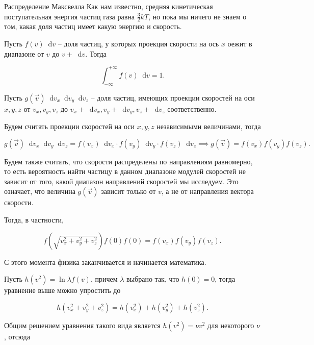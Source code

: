 \documentclass{article}
\renewcommand{\d}{\mathop{}\!\mathrm{d}}
\begin{document}
	\begin{section}{Распределение Максвелла}
		Как нам известно, средняя кинетическая поступательная энергия частиц газа равна $\frac{3}{2} kT$, но пока мы ничего не знаем о том, какая доля частиц имеет какую энергию и скорость.

		Пусть $f(v) \d v$ -- доля частиц, у которых проекция скорости на ось $x$ оежит в диапазоне от $v$ до $v + \d v$. Тогда

		\begin{equation*}
			\int_{-\infty}^{+\infty} f(v) \d v = 1.
		\end{equation*}

		Пусть $g(\vec{v}) \d v_x \d v_y \d v_z$ -- доля частиц, имеющих проекции скоростей на оси $x, y, z$ от $v_x, v_y, v_z$ до $v_x + \d v_x, v_y + \d v_y, v_z + \d v_z$ соответственно.

		Будем считать проекции скоростей на оси $x, y, z$ независимыми величинами, тогда

		\begin{equation*}
			g(\vec{v}) \d v_x \d v_y \d v_z = f(v_x) \d v_x \cdot f(v_y) \d v_y \cdot f(v_z) \d v_z \implies g(\vec{v}) = f(v_x) f(v_y) f(v_z).
		\end{equation*}

		Будем также считать, что скорости распределены по направлениям равномерно, то есть вероятность найти частицу в данном диапазоне модулей скоростей не зависит от того, какой диапазон направлений скоростей мы исследуем. Это означает, что величина $g(\vec{v})$ зависит только от $v$, а не от направления вектора скорости.

		Тогда, в частности,

		\begin{equation*}
			f \left( \sqrt{v_x^2 + v_y^2 + v_z^2} \right) f(0) f(0) = f(v_x) f(v_y) f(v_z).
		\end{equation*}

		С этого момента физика заканчивается и начинается математика.

		Пусть $h(v^2) = \ln \lambda f(v)$, причем $\lambda$ выбрано так, что $h(0) = 0$, тогда уравнение выше можно упростить до

		\begin{equation*}
			h \left(v_x^2 + v_y^2 + v_z^2 \right) = h \left(v_x^2 \right) + h \left(v_y^2 \right) + h \left(v_z^2 \right).
		\end{equation*}

		Общим решением уравнения такого вида является $h(v^2) = \nu v^2$ для некоторого $\nu$, отсюда


\end{section}
\end{document}
